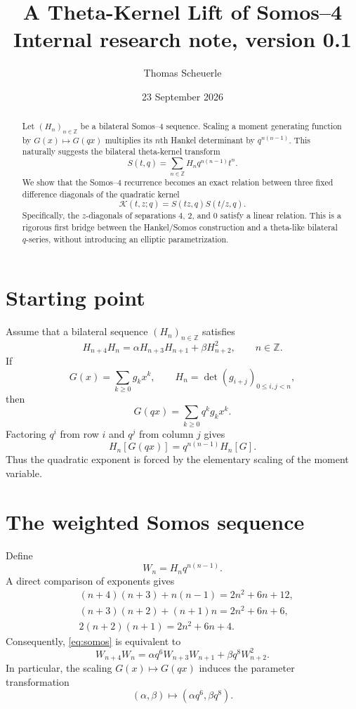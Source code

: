 \documentclass[11pt]{article}
\title{A Theta-Kernel Lift of Somos--4\\\large Internal research note, version 0.1}
\author{Thomas Scheuerle}
\date{23 September 2026}
\begin{document}
\maketitle

\begin{abstract}
Let $(H_n)_{n\in\mathbb Z}$ be a bilateral Somos--4 sequence. Scaling a moment generating function by $G(x)\mapsto G(qx)$ multiplies its $n$th Hankel determinant by $q^{n(n-1)}$. This naturally suggests the bilateral theta-kernel transform
\[
 S(t,q)=\sum_{n\in\mathbb Z}H_n q^{n(n-1)}t^n.
\]
We show that the Somos--4 recurrence becomes an exact relation between three fixed difference diagonals of the quadratic kernel
\[
 \mathcal K(t,z;q)=S(tz,q)S(t/z,q).
\]
Specifically, the $z$-diagonals of separations $4$, $2$, and $0$ satisfy a linear relation. This is a rigorous first bridge between the Hankel/Somos construction and a theta-like bilateral $q$-series, without introducing an elliptic parametrization.
\end{abstract}

\section{Starting point}
Assume that a bilateral sequence $(H_n)_{n\in\mathbb Z}$ satisfies
\begin{equation}
 H_{n+4}H_n=\alpha H_{n+3}H_{n+1}+\beta H_{n+2}^2,
 \qquad n\in\mathbb Z.
 \label{eq:somos}
\end{equation}
If
\[
 G(x)=\sum_{k\ge 0}g_kx^k,
 \qquad
 H_n=\det(g_{i+j})_{0\le i,j<n},
\]
then
\[
 G(qx)=\sum_{k\ge0}q^kg_kx^k.
\]
Factoring $q^i$ from row $i$ and $q^j$ from column $j$ gives
\begin{equation}
 H_n[G(qx)]=q^{n(n-1)}H_n[G].
 \label{eq:hankel-scaling}
\end{equation}
Thus the quadratic exponent is forced by the elementary scaling of the moment variable.

\section{The weighted Somos sequence}
Define
\begin{equation}
 W_n=H_nq^{n(n-1)}.
 \label{eq:Wdef}
\end{equation}
A direct comparison of exponents gives
\begin{align*}
 &(n+4)(n+3)+n(n-1)=2n^2+6n+12,\\
 &(n+3)(n+2)+(n+1)n=2n^2+6n+6,\\
 &2(n+2)(n+1)=2n^2+6n+4.
\end{align*}
Consequently, \eqref{eq:somos} is equivalent to
\begin{equation}
 W_{n+4}W_n
 =\alpha q^6W_{n+3}W_{n+1}
 +\beta q^8W_{n+2}^2.
 \label{eq:weighted-somos}
\end{equation}
In particular, the scaling $G(x)\mapsto G(qx)$ induces the parameter transformation
\[
 (\alpha,\beta)\longmapsto(\alpha q^6,\beta q^8).
\]
\end{document}
